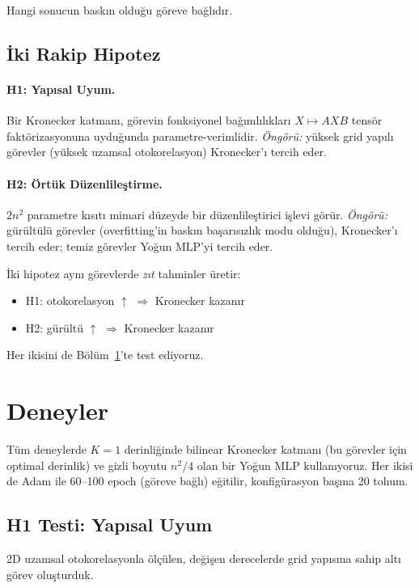 \documentclass[11pt,a4paper]{article}
\begin{document}
Hangi sonucun baskın olduğu göreve bağlıdır.

\subsection{İki Rakip Hipotez}
\label{sec:hypotheses}

\paragraph{H1: Yapısal Uyum.}
Bir Kronecker katmanı, görevin fonksiyonel bağımlılıkları
$X \mapsto AXB$ tensör faktörizasyonuna uyduğunda
parametre-verimlidir. \emph{Öngörü:} yüksek grid yapılı görevler
(yüksek uzamsal otokorelasyon) Kronecker'ı tercih eder.

\paragraph{H2: Örtük Düzenlileştirme.}
$2n^2$ parametre kısıtı mimari düzeyde bir düzenlileştirici
işlevi görür. \emph{Öngörü:} gürültülü görevler (overfitting'in
baskın başarısızlık modu olduğu), Kronecker'ı tercih eder;
temiz görevler Yoğun MLP'yi tercih eder.

İki hipotez aynı görevlerde \emph{zıt} tahminler üretir:
\begin{itemize}
\item H1: otokorelasyon $\uparrow$ $\Rightarrow$ Kronecker kazanır
\item H2: gürültü $\uparrow$ $\Rightarrow$ Kronecker kazanır
\end{itemize}

Her ikisini de Bölüm~\ref{sec:experiments}'te test ediyoruz.


\section{Deneyler}
\label{sec:experiments}

Tüm deneylerde $K=1$ derinliğinde bilinear Kronecker katmanı
(bu görevler için optimal derinlik) ve gizli boyutu $n^2/4$ olan
bir Yoğun MLP kullanıyoruz. Her ikisi de Adam ile 60--100 epoch
(göreve bağlı) eğitilir, konfigürasyon başına 20 tohum.

\subsection{H1 Testi: Yapısal Uyum}
\label{sec:h1}

2D uzamsal otokorelasyonla ölçülen, değişen derecelerde grid
yapısına sahip altı görev oluşturduk.
\end{document}
